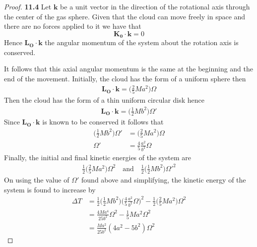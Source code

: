 \documentclass[11pt]{article}
\theoremstyle{definition}
\begin{document}
\begin{proof}{\textbf{11.4}}
        Let $\bm{k}$ be a unit vector in the direction of the rotational axis
        through the center of the gas sphere. Given that the cloud can move
        freely in space and there are no forces applied to it we have that
        $$\bm{K_0}\cdot\bm{k} = 0$$
        Hence $\bm{L_O} \cdot \bm{k}$ the angular momentum of the system about
        the rotation axis is conserved.

        It follows that this axial angular momentum is the same at the
        beginning and the end of the movement. Initially, the cloud has the
        form of a uniform sphere then
        \begin{align*}
            \bm{L_O} \cdot \bm{k} = \bigg(\frac{2}{5}Ma^2\bigg)\Omega
        \end{align*}
        Then the cloud has the form of a thin uniform circular disk hence
        \begin{align*}
            \bm{L_O} \cdot \bm{k} = \bigg(\frac{1}{2}Mb^2\bigg)\Omega'
        \end{align*}
        Since $\bm{L_O} \cdot \bm{k}$ is known to be conserved it follows that
        \begin{align*}
            \bigg(\frac{1}{2}Mb^2\bigg)\Omega' &= \bigg(\frac{2}{5}Ma^2\bigg)\Omega\\
            \Omega' &= \frac{4}{5}\frac{a^2}{b^2} \Omega
        \end{align*}
        Finally, the initial and ﬁnal kinetic energies of the system are
        \begin{align*}
            \frac{1}{2}\bigg(\frac{2}{5}Ma^2\bigg)\Omega^2
            \quad\text{and}\quad
            \frac{1}{2}\bigg(\frac{1}{2}Mb^2\bigg)\Omega'^2
        \end{align*}
        On using the value of $\Omega'$ found above and simplifying,
        the kinetic energy of the system is found to increase by
        \begin{align*}
            \Delta T &=
            \frac{1}{2}\bigg(\frac{1}{2}Mb^2\bigg)
            \bigg(\frac{4}{5}\frac{a^2}{b^2} \Omega\bigg)^2
            - \frac{1}{2}\bigg(\frac{2}{5}Ma^2\bigg)\Omega^2\\
            &= \frac{4Ma^4}{25b^2}\Omega^2 - \frac{1}{5}Ma^2\Omega^2\\
            &= \frac{Ma^2}{25b^2}(4a^2 - 5b^2)\Omega^2
        \end{align*}
\end{proof}
\cleardoublepage
\end{document}
